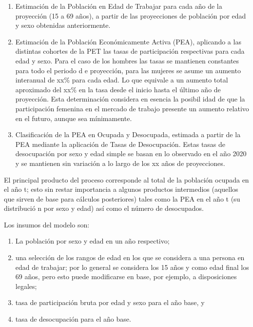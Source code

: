\begin{enumerate}
\item Estimación de la Población en Edad de Trabajar para cada año de la proyección (15 a 69 años), a partir de las proyecciones de población por edad y sexo obtenidas anteriormente.
\item Estimación de la Población Económicamente Activa (PEA), aplicando a las distintas cohortes de la PET las tasas de participación respectivas para cada edad y sexo. Para el caso de los hombres las tasas se mantienen constantes para todo el periodo d
e proyección, para las mujeres se asume un aumento interanual de xx\% para cada edad. Lo que equivale a un aumento total aproximado del xx\% en la tasa desde el inicio hasta el último año de proyección. Esta determinación considera en esencia la posibil
idad de que la participación femenina en el mercado de trabajo presente un aumento relativo en el futuro, aunque sea mínimamente. 
\item Clasificación de la PEA en Ocupada y Desocupada, estimada a partir de la PEA mediante la aplicación de Tasas de Desocupación. Estas tasas de desocupación por sexo y edad simple se basan en lo observado en el año 2020 y se mantienen sin variación a
 lo largo de los xx años de proyecciones.
\end{enumerate}

El principal producto del proceso corresponde al total de la población
ocupada en el año t; esto sin restar importancia a algunos productos
intermedios (aquellos que sirven de base para cálculos posteriores)
tales como la PEA en el año t (su distribució n por sexo y edad) así
como el número de desocupados.

Los insumos del modelo son:

\begin{enumerate}

\item La población por sexo y edad en un año respectivo;

\item una selección de los rangos de edad en los que se considera a una persona en edad de trabajar; por lo general se considera los 15 años y como edad final los 69 años, pero esto puede modificarse en base, por ejemplo, a disposiciones legales;

\item tasa de participación bruta por edad y sexo para el año base, y

\item tasa de desocupación para el año base.

\end{enumerate}

